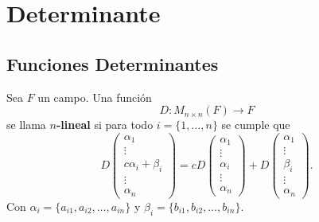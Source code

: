 \documentclass[12pt,a4paper]{book}
\newcommand{\llaves}[1]{\{#1\}}
\begin{document}
    \chapter{Determinante}

    \section{Funciones Determinantes}

    \begin{definicion}
        Sea $F$ un campo. Una función
        \[
        D:M_{n \times n}(F) \longrightarrow F
        \]
        se llama \textbf{$n$-lineal} si para todo $i = \llaves{1, \dots, n}$ se cumple que
        \[
        D
        \begin{pmatrix}
            \alpha_1\\
            \vdots\\
            c \alpha_i + \beta_i\\
            \vdots\\
            \alpha_n
        \end{pmatrix} = 
        cD
        \begin{pmatrix}
            \alpha_1\\
            \vdots\\
            \alpha_i\\
            \vdots\\
            \alpha_n
        \end{pmatrix} + D
        \begin{pmatrix}
            \alpha_1\\
            \vdots\\
            \beta_i\\
            \vdots\\
            \alpha_n
        \end{pmatrix}.
        \]
        Con $\alpha_i = \llaves{a_{i1}, a_{i2}, \dots , a_{in}}$ y $\beta_i = \llaves{b_{i1}, b_{i2}, \dots , b_{in}}$.
    \end{definicion}
\end{document}
